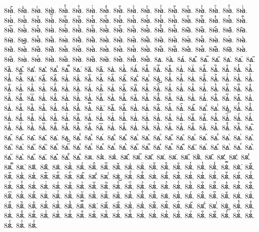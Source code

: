 {8ꙗ҆᷶.
8ꙗ᷷҆.
8ꙗ᷸҆.
8ꙗ᷹҆.
8ꙗ҆ⷠ.
8ꙗ҆ⷡ.
8ꙗ҆ⷢ.
8ꙗ҆ⷣ.
8ꙗ҆ⷤ.
8ꙗ҆ⷥ.
8ꙗ҆ⷦ.
8ꙗ҆ⷧ.
8ꙗ҆ⷨ.
8ꙗ҆ⷩ.
8ꙗ҆ⷪ.
8ꙗ҆ⷫ.
8ꙗ҆ⷬ.
8ꙗ҆ⷭ.
8ꙗ҆ⷮ.
8ꙗ҆ⷯ.
8ꙗ҆ⷰ.
8ꙗ҆ⷱ.
8ꙗ҆ⷲ.
8ꙗ҆ⷳ.
8ꙗ҆ⷴ.
8ꙗ҆ⷵ.
8ꙗ҆ⷶ.
8ꙗ҆ⷷ.
8ꙗ҆ⷸ.
8ꙗ҆ⷹ.
8ꙗ҆ⷺ.
8ꙗ҆ⷻ.
8ꙗ҆ⷼ.
8ꙗ҆ⷽ.
8ꙗ҆ⷾ.
8ꙗ҆ⷿ.
8ꙗ҆꙯.
8ꙗ҆ꙴ.
8ꙗ҆ꙵ.
8ꙗ҆ꙶ.
8ꙗ҆ꙷ.
8ꙗ҆ꙸ.
8ꙗ҆ꙹ.
8ꙗ҆ꙺ.
8ꙗ҆ꙻ.
8ꙗ҆꙼.
8ꙗ҆꙽.
8ꙗ҆ꚞ.
8ꙗ҆ꚟ.
8ꙗ҇.
8ꙗ᷀.
8ꙗ᷁.
8ꙗ᷶.
8ꙗ᷷.
8ꙗ᷸.
8ꙗ᷹.
8ꙗⷠ.
8ꙗⷡ.
8ꙗⷢ.
8ꙗⷣ.
8ꙗⷤ.
8ꙗⷥ.
8ꙗⷦ.
8ꙗⷧ.
8ꙗⷨ.
8ꙗⷩ.
8ꙗⷪ.
8ꙗⷫ.
8ꙗⷬ.
8ꙗⷭ.
8ꙗⷮ.
8ꙗⷯ.
8ꙗⷰ.
8ꙗⷱ.
8ꙗⷲ.
8ꙗⷳ.
8ꙗⷴ.
8ꙗⷵ.
8ꙗⷶ.
8ꙗⷷ.
8ꙗⷸ.
8ꙗⷹ.
8ꙗⷺ.
8ꙗⷻ.
8ꙗⷼ.
8ꙗⷽ.
8ꙗⷾ.
8ꙗⷿ.
8ꙗ꙯.
8ꙗꙴ.
8ꙗꙵ.
8ꙗꙶ.
8ꙗꙷ.
8ꙗꙸ.
8ꙗꙹ.
8ꙗꙺ.
8ꙗꙻ.
8ꙗ꙼.
8ꙗ꙽.
8ꙗꚞ.
8ꙗꚟ.
8ꙙ.
8ꙙ̀.
8ꙙ́.
8ꙙ̂.
8ꙙ̅.
8ꙙ̆.
8ꙙ̇.
8ꙙ̈.
8ꙙ̋.
8ꙙ̏.
8ꙙ̑.
8ꙙ̓.
8ꙙ̔.
8ꙙ̾.
8ꙙ̿.
8ꙙ͘.
8ꙙ҃.
8ꙙ҄.
8ꙙ҅.
8ꙙ҅̀.
8ꙙ҅́.
8ꙙ҅̂.
8ꙙ҅̅.
8ꙙ҅̆.
8ꙙ҅̇.
8ꙙ҅̈.
8ꙙ҅̋.
8ꙙ҅̏.
8ꙙ҅̑.
8ꙙ҅̓.
8ꙙ҅̔.
8ꙙ҅̾.
8ꙙ҅̿.
8ꙙ҅͘.
8ꙙ҅҃.
8ꙙ҅҄.
8ꙙ҅҅.
8ꙙ҅҆.
8ꙙ҅҇.
8ꙙ҅᷀.
8ꙙ҅᷁.
8ꙙ҅᷶.
8ꙙ᷷҅.
8ꙙ᷸҅.
8ꙙ᷹҅.
8ꙙ҅ⷠ.
8ꙙ҅ⷡ.
8ꙙ҅ⷢ.
8ꙙ҅ⷣ.
8ꙙ҅ⷤ.
8ꙙ҅ⷥ.
8ꙙ҅ⷦ.
8ꙙ҅ⷧ.
8ꙙ҅ⷨ.
8ꙙ҅ⷩ.
8ꙙ҅ⷪ.
8ꙙ҅ⷫ.
8ꙙ҅ⷬ.
8ꙙ҅ⷭ.
8ꙙ҅ⷮ.
8ꙙ҅ⷯ.
8ꙙ҅ⷰ.
8ꙙ҅ⷱ.
8ꙙ҅ⷲ.
8ꙙ҅ⷳ.
8ꙙ҅ⷴ.
8ꙙ҅ⷵ.
8ꙙ҅ⷶ.
8ꙙ҅ⷷ.
8ꙙ҅ⷸ.
8ꙙ҅ⷹ.
8ꙙ҅ⷺ.
8ꙙ҅ⷻ.
8ꙙ҅ⷼ.
8ꙙ҅ⷽ.
8ꙙ҅ⷾ.
8ꙙ҅ⷿ.
8ꙙ҅꙯.
8ꙙ҅ꙴ.
8ꙙ҅ꙵ.
8ꙙ҅ꙶ.
8ꙙ҅ꙷ.
8ꙙ҅ꙸ.
8ꙙ҅ꙹ.
8ꙙ҅ꙺ.
8ꙙ҅ꙻ.
8ꙙ҅꙼.
8ꙙ҅꙽.
8ꙙ҅ꚞ.
8ꙙ҅ꚟ.
8ꙙ҆.
8ꙙ҆̀.
8ꙙ҆́.
8ꙙ҆̂.
8ꙙ҆̅.
8ꙙ҆̆.
8ꙙ҆̇.
8ꙙ҆̈.
8ꙙ҆̋.
8ꙙ҆̏.
8ꙙ҆̑.
8ꙙ҆̓.
8ꙙ҆̔.
8ꙙ҆̾.
8ꙙ҆̿.
8ꙙ҆͘.
8ꙙ҆҃.
8ꙙ҆҄.
8ꙙ҆҅.
8ꙙ҆҆.
8ꙙ҆҇.
8ꙙ҆᷀.
8ꙙ҆᷁.
8ꙙ҆᷶.
8ꙙ᷷҆.
8ꙙ᷸҆.
8ꙙ᷹҆.
8ꙙ҆ⷠ.
8ꙙ҆ⷡ.
8ꙙ҆ⷢ.
8ꙙ҆ⷣ.
8ꙙ҆ⷤ.
8ꙙ҆ⷥ.
8ꙙ҆ⷦ.
8ꙙ҆ⷧ.
8ꙙ҆ⷨ.
8ꙙ҆ⷩ.
8ꙙ҆ⷪ.
8ꙙ҆ⷫ.
8ꙙ҆ⷬ.
8ꙙ҆ⷭ.
8ꙙ҆ⷮ.
8ꙙ҆ⷯ.
8ꙙ҆ⷰ.
8ꙙ҆ⷱ.
8ꙙ҆ⷲ.
8ꙙ҆ⷳ.
8ꙙ҆ⷴ.
8ꙙ҆ⷵ.
8ꙙ҆ⷶ.
8ꙙ҆ⷷ.
8ꙙ҆ⷸ.
8ꙙ҆ⷹ.
8ꙙ҆ⷺ.
8ꙙ҆ⷻ.
8ꙙ҆ⷼ.
8ꙙ҆ⷽ.
8ꙙ҆ⷾ.
8ꙙ҆ⷿ.
8ꙙ҆꙯.
8ꙙ҆ꙴ.
8ꙙ҆ꙵ.
8ꙙ҆ꙶ.
8ꙙ҆ꙷ.
8ꙙ҆ꙸ.
8ꙙ҆ꙹ.
8ꙙ҆ꙺ.
8ꙙ҆ꙻ.
8ꙙ҆꙼.
8ꙙ҆꙽.
8ꙙ҆ꚞ.
8ꙙ҆ꚟ.
8ꙙ҇.
8ꙙ᷀.
8ꙙ᷁.
8ꙙ᷶.
8ꙙ᷷.
8ꙙ᷸.
8ꙙ᷹.
8ꙙⷠ.
8ꙙⷡ.
8ꙙⷢ.
8ꙙⷣ.
8ꙙⷤ.
8ꙙⷥ.
8ꙙⷦ.
8ꙙⷧ.
8ꙙⷨ.
8ꙙⷩ.
8ꙙⷪ.
8ꙙⷫ.
8ꙙⷬ.
8ꙙⷭ.
8ꙙⷮ.
8ꙙⷯ.
8ꙙⷰ.
8ꙙⷱ.
8ꙙⷲ.
8ꙙⷳ.
8ꙙⷴ.
8ꙙⷵ.
8ꙙⷶ.
8ꙙⷷ.
8ꙙⷸ.
8ꙙⷹ.
8ꙙⷺ.
8ꙙⷻ.
8ꙙⷼ.
8ꙙⷽ.
8ꙙⷾ.
8ꙙⷿ.
8ꙙ꙯.
8ꙙꙴ.
8ꙙꙵ.
8ꙙꙶ.
8ꙙꙷ.
8ꙙꙸ.
8ꙙꙹ.
8ꙙꙺ.
8ꙙꙻ.
8ꙙ꙼.
8ꙙ꙽.
8ꙙꚞ.
8ꙙꚟ.
8ꙛ.
8ꙛ̀.
8ꙛ́.
8ꙛ̂.
8ꙛ̅.
8ꙛ̆.
8ꙛ̇.
8ꙛ̈.
8ꙛ̋.
8ꙛ̏.
8ꙛ̑.
8ꙛ̓.
8ꙛ̔.
8ꙛ̾.
8ꙛ̿.
8ꙛ͘.
8ꙛ҃.
8ꙛ҄.
8ꙛ҅.
8ꙛ҅̀.
8ꙛ҅́.
8ꙛ҅̂.
8ꙛ҅̅.
8ꙛ҅̆.
8ꙛ҅̇.
8ꙛ҅̈.
8ꙛ҅̋.
8ꙛ҅̏.
8ꙛ҅̑.
8ꙛ҅̓.
8ꙛ҅̔.
8ꙛ҅̾.
8ꙛ҅̿.
8ꙛ҅͘.
8ꙛ҅҃.
8ꙛ҅҄.
8ꙛ҅҅.
8ꙛ҅҆.
8ꙛ҅҇.
8ꙛ҅᷀.
8ꙛ҅᷁.
8ꙛ҅᷶.
8ꙛ᷷҅.
8ꙛ᷸҅.
8ꙛ᷹҅.
8ꙛ҅ⷠ.
8ꙛ҅ⷡ.
8ꙛ҅ⷢ.
8ꙛ҅ⷣ.
8ꙛ҅ⷤ.
8ꙛ҅ⷥ.
8ꙛ҅ⷦ.
8ꙛ҅ⷧ.
8ꙛ҅ⷨ.
8ꙛ҅ⷩ.
8ꙛ҅ⷪ.
8ꙛ҅ⷫ.
8ꙛ҅ⷬ.
8ꙛ҅ⷭ.
8ꙛ҅ⷮ.
8ꙛ҅ⷯ.
8ꙛ҅ⷰ.
8ꙛ҅ⷱ.
8ꙛ҅ⷲ.
8ꙛ҅ⷳ.
8ꙛ҅ⷴ.
8ꙛ҅ⷵ.
8ꙛ҅ⷶ.
8ꙛ҅ⷷ.
8ꙛ҅ⷸ.
8ꙛ҅ⷹ.
8ꙛ҅ⷺ.
8ꙛ҅ⷻ.
8ꙛ҅ⷼ.
8ꙛ҅ⷽ.
8ꙛ҅ⷾ.
8ꙛ҅ⷿ.
8ꙛ҅꙯.
8ꙛ҅ꙴ.
8ꙛ҅ꙵ.
8ꙛ҅ꙶ.
8ꙛ҅ꙷ.
8ꙛ҅ꙸ.
8ꙛ҅ꙹ.
8ꙛ҅ꙺ.
8ꙛ҅ꙻ.
8ꙛ҅꙼.
8ꙛ҅꙽.
8ꙛ҅ꚞ.
8ꙛ҅ꚟ.
8ꙛ҆.
8ꙛ҆̀.
8ꙛ҆́.
8ꙛ҆̂.
8ꙛ҆̅.
8ꙛ҆̆.
8ꙛ҆̇.
8ꙛ҆̈.
8ꙛ҆̋.
8ꙛ҆̏.
8ꙛ҆̑.
8ꙛ҆̓.
8ꙛ҆̔.
8ꙛ҆̾.
8ꙛ҆̿.
8ꙛ҆͘.
8ꙛ҆҃.
8ꙛ҆҄.
8ꙛ҆҅.
8ꙛ҆҆.
8ꙛ҆҇.
8ꙛ҆᷀.
8ꙛ҆᷁.
8ꙛ҆᷶.
8ꙛ᷷҆.
8ꙛ᷸҆.
8ꙛ᷹҆.
8ꙛ҆ⷠ.
8ꙛ҆ⷡ.
8ꙛ҆ⷢ.
8ꙛ҆ⷣ.
8ꙛ҆ⷤ.
8ꙛ҆ⷥ.
8ꙛ҆ⷦ.
8ꙛ҆ⷧ.
8ꙛ҆ⷨ.
8ꙛ҆ⷩ.
8ꙛ҆ⷪ.
8ꙛ҆ⷫ.
8ꙛ҆ⷬ.
8ꙛ҆ⷭ.
8ꙛ҆ⷮ.
8ꙛ҆ⷯ.
8ꙛ҆ⷰ.
8ꙛ҆ⷱ.
8ꙛ҆ⷲ.
8ꙛ҆ⷳ.
8ꙛ҆ⷴ.
8ꙛ҆ⷵ.
8ꙛ҆ⷶ.
8ꙛ҆ⷷ.
8ꙛ҆ⷸ.
8ꙛ҆ⷹ.
}
